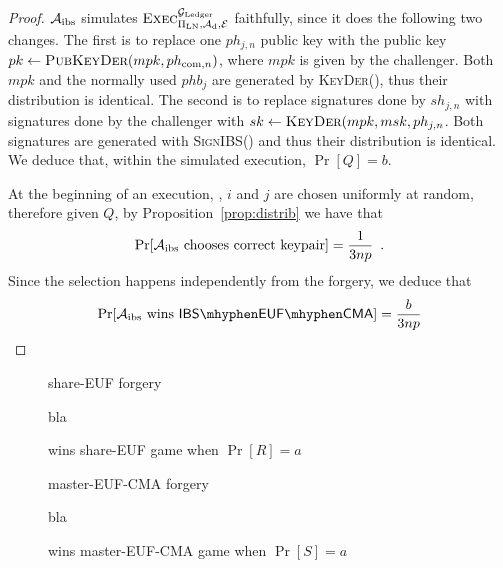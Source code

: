   \begin{proof}
    $\mathcal{A}_{\mathrm{ibs}}$ simulates
    $\textsc{Exec}^{\mathcal{G}_{\mathrm{Ledger}}}_{\Pi_{\mathrm{LN}}, \mathcal{A}_{\mathrm{d}},
    \mathcal{E}}$ faithfully, since it does the following two changes. The
    first is to replace one $ph_{j, n}$ public key with the public key $pk \gets
    \textsc{PubKeyDer}(mpk, ph_{\mathrm{com}, n})$, where $mpk$ is given by the
    challenger. Both $mpk$ and the normally used $phb_j$ are generated by
    \textsc{KeyDer}(), thus their distribution is identical. The second is to
    replace signatures done by $sh_{j, n}$ with signatures done by the
    challenger with $sk \gets \textsc{KeyDer}(mpk, msk, ph_{j, n}$. Both
    signatures are generated with \textsc{SignIBS}() and thus their distribution
    is identical. We deduce that, within the simulated execution, $\Pr[Q] = b$.

    At the beginning of an execution, \alice, $i$ and $j$ are chosen uniformly
    at random, therefore given $Q$, by Proposition~\ref{prop:distrib} we have
    that
    \begin{equation*}
      \Pr[\mathcal{A}_{\mathrm{ibs}} \text{ chooses correct keypair}] =
      \frac{1}{3np} \enspace.
    \end{equation*}
    Since the selection happens independently from the forgery, we deduce that
    \begin{equation*}
      \Pr[\adversary_{\mathrm{ibs}} \text{ wins } \mathsf{IBS \mhyphen EUF
      \mhyphen CMA}] = \frac{b}{3np}
    \end{equation*}
  \end{proof}

  \begin{figure}[H]
    \begin{algobox}{\textsf{share-EUF} forgery}
      \begin{algorithmic}[1]
        \State bla
      \end{algorithmic}
    \end{algobox}
    \caption{wins \textsf{share-EUF} game when $\Pr[R] = a$}
    \label{alg:forge:share}
  \end{figure}

  \begin{figure}[H]
    \begin{algobox}{\textsf{master-EUF-CMA} forgery}
      \begin{algorithmic}[1]
        \State bla
      \end{algorithmic}
    \end{algobox}
    \caption{wins \textsf{master-EUF-CMA} game when $\Pr[S] = a$}
    \label{alg:forge:master}
  \end{figure}
